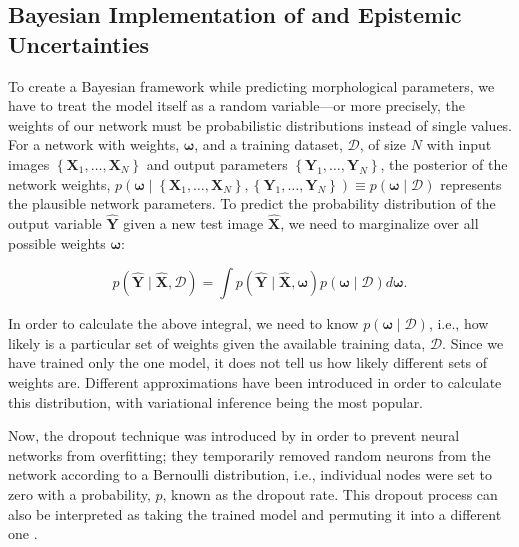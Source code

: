 \subsection{Bayesian Implementation of \gampen{} and Epistemic Uncertainties} \label{subsec_c2:mcd}
To create a Bayesian framework while predicting morphological parameters, we have to treat the model itself as a random variable---or more precisely, the weights of our network %
must be probabilistic distributions instead of single
values. For a network with weights, $\boldsymbol{\omega}$, and a training dataset, $\mathcal{D}$, of size $N$ with input images $\left\{\boldsymbol{X}_{1}, \ldots, \boldsymbol{X}_{N}\right\}$ and output parameters $\left\{\boldsymbol{Y}_{1}, \ldots, \boldsymbol{Y}_{N}\right\}$, the posterior of the network weights, $p(\boldsymbol{\omega} \mid \left\{\boldsymbol{X}_{1}, \ldots, \boldsymbol{X}_{N}\right\}, \left\{\boldsymbol{Y}_{1}, \ldots, \boldsymbol{Y}_{N}\right\}) \equiv p(\boldsymbol{\omega} \mid \mathcal{D}) $ represents the plausible network parameters. To predict the probability distribution of the output variable $\boldsymbol{\hat{Y}}$ given a new test image $\boldsymbol{\hat{X}}$, we need to marginalize over all possible weights $\boldsymbol{\omega}$:

\begin{equation}
p(\boldsymbol{\hat{Y}} \mid \boldsymbol{\hat{X}}, \mathcal{D})=\int p(\boldsymbol{\hat{Y}} \mid \boldsymbol{\hat{X}}, \boldsymbol{\omega}) p(\boldsymbol{\omega} \mid \mathcal{D}) d \boldsymbol{\omega} .
\label{eq:out_y_pred}
\end{equation}

In order to calculate the above integral, we need to know $p(\boldsymbol{\omega}\mid\mathcal{D})$, i.e., how likely is a particular set of weights given the available training data, $\mathcal{D}$. Since we have trained only the one model, it does not tell us how likely different sets of weights are. Different approximations have been introduced in order to calculate this distribution, with variational inference \citep{Jordan1999IntroductionModels} being the most popular.

Now, the dropout technique was introduced by \cite{Srivastava2014Dropout:Overfitting} in order to prevent neural networks from overfitting; they temporarily removed random neurons from the network according to a Bernoulli distribution, i.e., individual nodes were set to zero with a probability, $p$, known as the dropout rate. This dropout process can also be interpreted as taking the trained model and permuting it into a different one \citep{Srivastava2014Dropout:Overfitting}.

